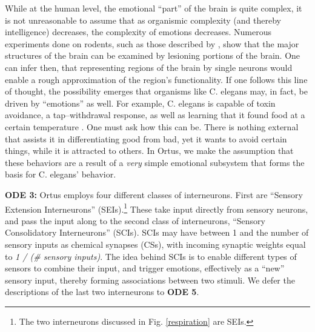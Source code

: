 \documentclass[letterpaper]{article}
\begin{document}
While at the human level, the emotional ``part'' of the brain is quite complex, it is not unreasonable to assume that as organismic complexity (and thereby intelligence) decreases, the complexity of emotions decreases. Numerous experiments done on rodents, such as those described by \citet{Weiner2015}, show that the major structures of the brain can be examined by lesioning portions of the brain. One can infer then, that representing regions of the brain by single neurons would enable a rough approximation of the region's functionality. If one follows this line of thought, the possibility emerges that organisms like C. elegans may, in fact, be driven by ``emotions'' as well. For example, C. elegans is capable of toxin avoidance, a tap--withdrawal response, as well as learning that it found food at a certain temperature \citep{Wicks1996,Xu2012}. One must ask how this can be. There is nothing external that assists it in differentiating good from bad, yet it wants to avoid certain things, while it is attracted to others. In Ortus, we make the assumption that these behaviors are a result of a \textit{very} simple emotional subsystem that forms the basis for C. elegans' behavior.


\textbf{ODE 3:} Ortus employs four different classes of interneurons. First are ``Sensory Extension Interneurons'' (SEIs).\footnote{The two interneurons discussed in Fig. \ref{respiration} are SEIs.} These take input directly from sensory neurons, and pass the input along to the second class of interneurons, ``Sensory Consolidatory Interneurons'' (SCIs).
SCIs may have between 1 and the number of sensory inputs as chemical synapses (CSs), with incoming synaptic weights equal to \textit{1 / (\# sensory inputs)}.
The idea behind SCIs is to enable different types of sensors to combine their input, and trigger emotions, effectively as a ``new'' sensory input, thereby forming associations between two stimuli. We defer the descriptions of the last two interneurons to \textbf{ODE 5}.
\end{document}
